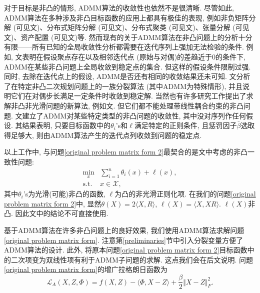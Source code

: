 \documentclass[UTF8,10.5pt,a4paper]{ctexart}
\theoremstyle{definition}
\theoremstyle{definition}
\newcommand{\mcL}{\mathcal{L}}
\newcommand{\st}{\mathrm{s.t.}}
\begin{document}
\par 对于目标是非凸的情形, ADMM算法的收敛性也依然不是很清晰. 尽管如此, ADMM算法在多种涉及非凸目标函数的应用上都具有极佳的表现, 例如非负矩阵分解 (可见文\cite{Zhang2010An,Sun2014Alternating})、分布式矩阵分解 (可见文\cite{Zhang2014Asynchronous})、分布式聚类 (可见文\cite{Forero2011Distributed})、张量分解 (可见文\cite{Liavas2013Parallel})、资产配置 (可见文\cite{Wen2013Asset})等. 然而现有的关于ADMM算法在非凸问题上的分析十分有限——所有已知的全局收敛性分析都需要在迭代序列上强加无法检验的条件. 例如, 文\cite{Jiang2013Alternating,Shen2014Augmented,Xu2011An,Wen2013Asset}表明在假设聚点存在以及相邻迭代点 (原始与对偶)的差趋近于0的条件下, ADMM在某些非凸问题上全局收敛到稳定点的集合. 但这样的假设条件限制过强. 同时, 去除在迭代点上的假设, ADMM是否还有相同的收敛结果还未可知. 文\cite{Zhang2010Convergence}分析了在特定非凸二次规划问题上的一族分裂算法 (其中ADMM为特殊情形), 并且说明它们在对偶步长满足一定条件时收敛到稳定解. 当然也有许多研究工作提出了求解非凸非光滑问题的新算法, 例如文\cite{Razaviyayn2013A,Ghadimi2015Accelerated,Ghadimi2014Mini,Scutari2014Decomposition,Bolte2014Proximal}. 但它们都不能处理带线性耦合约束的非凸问题. 文\cite{Hong2016COnvergence}建立了ADMM对某些特定类型的非凸问题的收敛性, 其中没对序列作任何假设. 其结果表明, 只要目标函数中的$\theta_i$'s和$\ell$满足特定的正则条件, 且惩罚因子$\bar\beta$选取得足够大, 则由ADMM算法产生的迭代点列收敛到问题的稳定点. 
\par 以上工作中, 与问题\eqref{original problem matrix form 2}最契合的是文\cite{Hong2016COnvergence}中考虑的非凸一致性问题:
$$\begin{array}{rl}
	\min\limits_x & \sum\limits_{i=1}^n\theta_i(x)+\ell(x),\\
	\st & x\in \mathcal{X},
\end{array}$$
其中$\theta_i$'s为光滑(可能)非凸的函数, $\ell$为凸的非光滑正则化项. 在我们的问题\eqref{original problem matrix form 2}中, 显然$\theta(X)=2\langle X,R\rangle$, $\ell(X)=\langle X,XR\rangle$. $\ell(X)$非凸. 因此文\cite{Hong2016COnvergence}中的结论不可直接使用.
\par 基于ADMM算法在许多非凸问题上的良好效果, 我们使用ADMM算法求解问题\eqref{original problem matrix form}. 注意第\ref{preliminaries}节中引入分裂变量方便了ADMM算法的设计. 此外, 将原本问题\eqref{original problem matrix form 2}目标函数中的二次项变为双线性项有利于ADMM子问题的求解. 这点我们会在后文说明. 问题\eqref{original problem matrix form}的增广拉格朗日函数为
\begin{equation}
	\mcL_A(X,Z,\Phi)=f(X,Z)-\langle\Phi,X-Z\rangle+\frac{\beta}{2}\Vert X-Z\Vert_F^2.
	\label{alf}
\end{equation}
\end{document}
